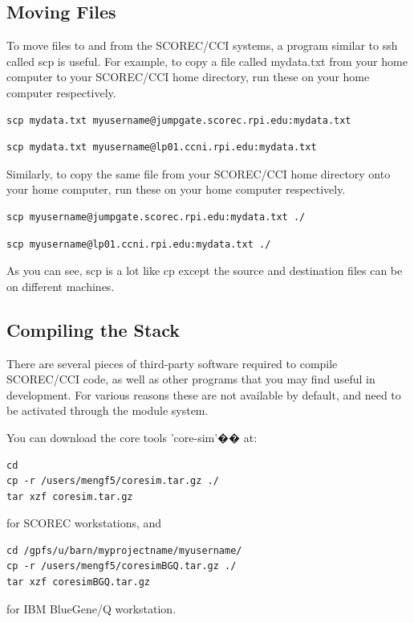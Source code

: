 \documentclass{article}
\begin{document}
\subsection{Moving Files}
\label{ch:1.3}
To move files to and from the SCOREC/CCI systems, a program similar to ssh called scp is useful. For example, to copy a file called mydata.txt from your home computer to your SCOREC/CCI home directory, run these on your home computer respectively.
\begin{lstlisting}
scp mydata.txt myusername@jumpgate.scorec.rpi.edu:mydata.txt
\end{lstlisting}
\begin{lstlisting} 
scp mydata.txt myusername@lp01.ccni.rpi.edu:mydata.txt
\end{lstlisting}

Similarly, to copy the same file from your SCOREC/CCI home directory onto your home computer, run these on your home computer respectively.

\begin{lstlisting}
scp myusername@jumpgate.scorec.rpi.edu:mydata.txt ./
\end{lstlisting}
\begin{lstlisting} 
scp myusername@lp01.ccni.rpi.edu:mydata.txt ./
\end{lstlisting} 
As you can see, scp is a lot like cp except the source and destination files can be on different machines.

\subsection{Compiling the Stack}
\label{ch:1.4}
There are several pieces of third-party software required to compile SCOREC/CCI code, as well as other programs that you may find useful in development. For various reasons these are not available by default, and need to be activated through the module system. 

You can download the core tools 'core-sim'�� at:

\begin{lstlisting}
cd
cp -r /users/mengf5/coresim.tar.gz ./
tar xzf coresim.tar.gz
\end{lstlisting}
for SCOREC workstations, and 
\begin{lstlisting}
cd /gpfs/u/barn/myprojectname/myusername/
cp -r /users/mengf5/coresimBGQ.tar.gz ./
tar xzf coresimBGQ.tar.gz
\end{lstlisting}
for IBM BlueGene/Q workstation.
\end{document}

